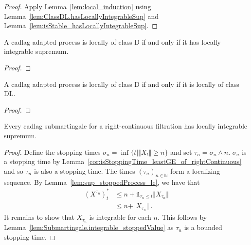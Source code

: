 \begin{proof}
  \leanok
Apply Lemma~\ref{lem:local_induction} using Lemma~\ref{lem:ClassDL.hasLocallyIntegrableSup} and Lemma~\ref{lem:isStable_hasLocallyIntegrableSup}.
\end{proof}


\begin{lemma}\label{lem:locally_classD_iff_locallyIntegrableSup}
A cadlag adapted process is locally of class D if and only if it has locally integrable supremum.
\end{lemma}

\begin{proof}

\end{proof}


\begin{lemma}\label{lem:locally_classD_iff_locally_classDL}
A cadlag adapted process is locally of class D if and only if it is locally of class DL.
\end{lemma}

\begin{proof}

\end{proof}


\begin{lemma}\label{lem:Submartingale.locallyIntegrableSup}
Every cadlag submartingale for a right-continuous filtration has locally integrable supremum.
\end{lemma}

\begin{proof}
Define the stopping times $\sigma_n = \inf\{t \mid \Vert X_t \Vert \ge n\}$ and set $\tau_n = \sigma_n \wedge n$.
$\sigma_n$ is a stopping time by Lemma~\ref{cor:isStoppingTime_leastGE_of_rightContinuous} and so $\tau_n$ is also a stopping time.
The times $(\tau_n)_{n \in \mathbb{N}}$ form a localizing sequence.
By Lemma~\ref{lem:sup_stoppedProcess_le}, we have that
\begin{align*}
  (X^{\tau_n})^*_t
  & \le n + \mathbb{1}_{\tau_n \le t} \Vert X_{\tau_n} \Vert \\
  & \le n + \Vert X_{\tau_n} \Vert
  \: .
\end{align*}
It remains to show that $X_{\tau_n}$ is integrable for each $n$.
This follows by Lemma~\ref{lem:Submartingale.integrable_stoppedValue} as $\tau_n$ is a bounded stopping time.
\end{proof}



